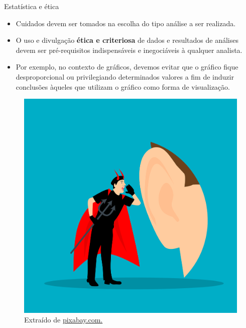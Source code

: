 \documentclass[
  ignorenonframetext,
  serif,
  professionalfont,
  usenames,
  dvipsnames,
  aspectratio = 169]{beamer}
\def\beginAHalfColumn{\begin{minipage}{0.49\textwidth}}%
\def\endColumns{\end{minipage}}%
\begin{document}
\begin{frame}{Estatística e ética}
\protect\hypertarget{estatuxedstica-e-uxe9tica}{}
\beginAHalfColumn

\begin{itemize}
\item
  Cuidados devem ser tomados na escolha do tipo análise a ser realizada.
\item
  O uso e divulgação \textbf{ética e criteriosa} de dados e resultados
  de análises devem ser pré-requisitos indispensáveis e inegociáveis à
  qualquer analista.
\item
  Por exemplo, no contexto de gráficos, devemos evitar que o gráfico
  fique desproporcional ou privilegiando determinados valores a fim de
  induzir conclusões àqueles que utilizam o gráfico como forma de
  visualização.
\end{itemize}

\endColumns
\beginAHalfColumn

\begin{figure}

{\centering \includegraphics[width=0.75\linewidth]{./img/etica} 

}

\caption{Extraído de \href{https://cdn.pixabay.com/photo/2021/11/13/18/48/devil-6792088_1280.png}{pixabay.com.}}\label{fig:unnamed-chunk-7}
\end{figure}

\endColumns
\end{frame}
\end{document}
